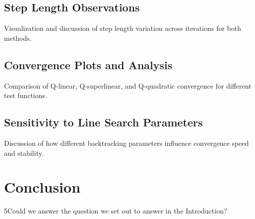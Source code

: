 \documentclass[12pt]{article}
\begin{document}
\subsection{Step Length Observations}
Visualization and discussion of step length variation across iterations for both methods.

\subsection{Convergence Plots and Analysis}
Comparison of Q-linear, Q-superlinear, and Q-quadratic convergence for different test functions.

\subsection{Sensitivity to Line Search Parameters}
Discussion of how different backtracking parameters influence convergence speed and stability.


\section{Conclusion}

5Could we answer the question we set out to answer in the Introduction?
\end{document}
